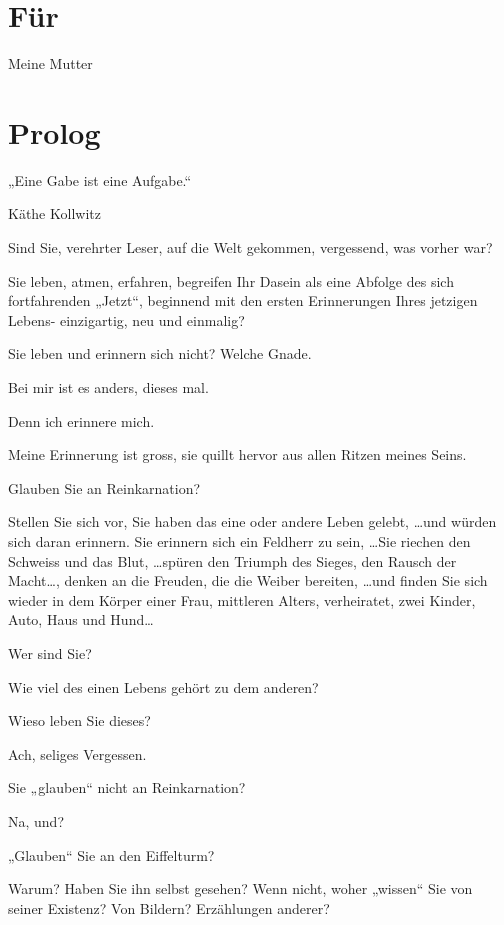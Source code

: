 \documentclass[10pt,titlepage,a5paper]{book}
\newenvironment{dichter}{\begin{flushright}}{\end{flushright}}
\begin{document}
\thispagestyle{empty}


\chapter*{Für}

Meine Mutter

\chapter*{Prolog}




„Eine Gabe ist eine Aufgabe.“
\begin{dichter} Käthe Kollwitz\end{dichter}

Sind Sie, verehrter Leser,  auf die Welt gekommen, vergessend, was vorher war?

Sie leben,  atmen, erfahren, begreifen Ihr Dasein als eine Abfolge des sich fortfahrenden „Jetzt“, beginnend mit den ersten Erinnerungen Ihres jetzigen Lebens- einzigartig, neu und einmalig?

Sie leben und erinnern sich nicht? Welche Gnade.

Bei mir ist es anders, dieses  mal.

Denn ich erinnere mich.

Meine Erinnerung ist gross, sie quillt hervor aus allen Ritzen meines Seins.

Glauben Sie an Reinkarnation?

Stellen Sie sich vor, Sie haben das eine oder andere Leben gelebt, \dots und würden sich daran erinnern. Sie erinnern sich ein Feldherr zu sein, \dots Sie riechen den Schweiss und das Blut, \dots spüren den Triumph des Sieges, den Rausch der Macht\dots, denken an die Freuden, die die Weiber bereiten, \dots und finden Sie sich wieder in dem Körper einer Frau, mittleren Alters, verheiratet, zwei Kinder, Auto, Haus und Hund\dots

Wer sind Sie?

Wie viel des einen Lebens gehört zu dem anderen?

Wieso leben Sie dieses?

Ach, seliges Vergessen.

Sie „glauben“ nicht an Reinkarnation?
 
Na, und?

„Glauben“ Sie an den Eiffelturm?

Warum? Haben Sie ihn selbst gesehen? Wenn nicht, woher „wissen“ Sie von seiner Existenz? Von Bildern? Erzählungen anderer?
\end{document}
